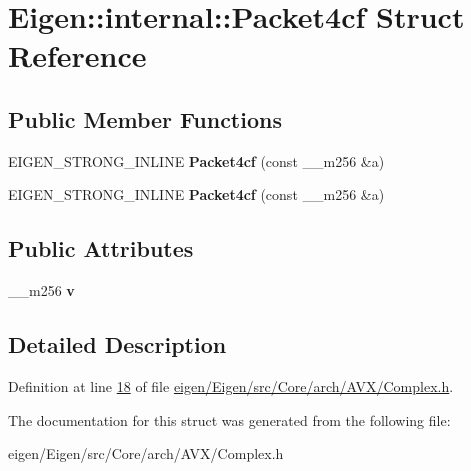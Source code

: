 \hypertarget{struct_eigen_1_1internal_1_1_packet4cf}{}\section{Eigen\+:\+:internal\+:\+:Packet4cf Struct Reference}
\label{struct_eigen_1_1internal_1_1_packet4cf}
\subsection*{Public Member Functions}
\begin{DoxyCompactItemize}
\item 
\mbox{\label{struct_eigen_1_1internal_1_1_packet4cf_a680cd59d1fc53b23b55be6d30016dad6}} 
E\+I\+G\+E\+N\+\_\+\+S\+T\+R\+O\+N\+G\+\_\+\+I\+N\+L\+I\+NE {\bfseries Packet4cf} (const \+\_\+\+\_\+m256 \&a)
\item 
\mbox{\label{struct_eigen_1_1internal_1_1_packet4cf_a680cd59d1fc53b23b55be6d30016dad6}} 
E\+I\+G\+E\+N\+\_\+\+S\+T\+R\+O\+N\+G\+\_\+\+I\+N\+L\+I\+NE {\bfseries Packet4cf} (const \+\_\+\+\_\+m256 \&a)
\end{DoxyCompactItemize}
\subsection*{Public Attributes}
\begin{DoxyCompactItemize}
\item 
\mbox{\label{struct_eigen_1_1internal_1_1_packet4cf_a8ee32107cbfc9c17077f3b68d8f61e75}} 
\+\_\+\+\_\+m256 {\bfseries v}
\end{DoxyCompactItemize}


\subsection{Detailed Description}


Definition at line \hyperlink{eigen_2_eigen_2src_2_core_2arch_2_a_v_x_2_complex_8h_source_l00018}{18} of file \hyperlink{eigen_2_eigen_2src_2_core_2arch_2_a_v_x_2_complex_8h_source}{eigen/\+Eigen/src/\+Core/arch/\+A\+V\+X/\+Complex.\+h}.



The documentation for this struct was generated from the following file\+:\begin{DoxyCompactItemize}
\item 
eigen/\+Eigen/src/\+Core/arch/\+A\+V\+X/\+Complex.\+h\end{DoxyCompactItemize}
